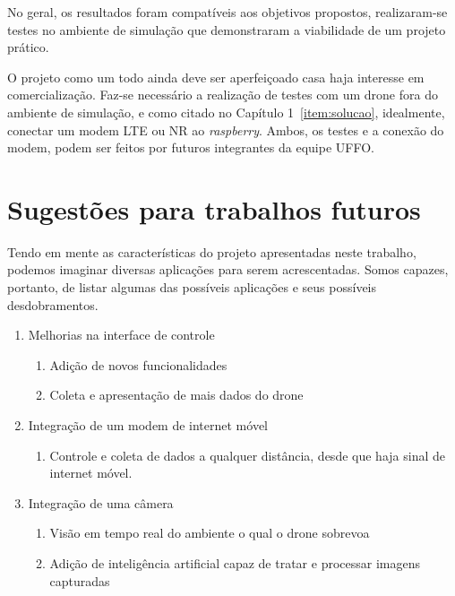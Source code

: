 \documentclass[12pt,a4paper,oneside]{book}
\begin{document}
No geral, os resultados foram compatíveis aos objetivos propostos, realizaram-se testes no ambiente de simulação que demonstraram a viabilidade de um projeto prático.  

O projeto como um todo ainda deve ser aperfeiçoado casa haja interesse em comercialização. Faz-se necessário a realização de testes com um drone fora do ambiente de simulação, e como citado no Capítulo 1~\ref{item:solucao}, idealmente, conectar um modem LTE ou NR ao \textit{raspberry}. Ambos, os testes e a conexão do modem, podem ser feitos por futuros integrantes da equipe UFFO.



\chapter{Sugestões para trabalhos futuros}
%
\thispagestyle{empty} 
%
%
Tendo em mente as características do projeto apresentadas neste trabalho, podemos imaginar diversas aplicações para serem acrescentadas. Somos capazes, portanto, de listar algumas das possíveis aplicações e seus possíveis desdobramentos.
%
\begin{enumerate}
    \item Melhorias na interface de controle 
        \begin{enumerate}
            \item Adição de novos funcionalidades
            \item Coleta e apresentação de mais dados do drone  
        \end{enumerate}
    \item Integração de um modem de internet móvel
        \begin{enumerate}
            \item Controle e coleta de dados a qualquer distância, desde que haja sinal de internet móvel.
        \end{enumerate}
    \item Integração de uma câmera
        \begin{enumerate}
            \item Visão em tempo real do ambiente o qual o drone sobrevoa
            \item Adição de inteligência artificial capaz de tratar e processar imagens capturadas
        \end{enumerate}
\end{enumerate}
\end{document}
